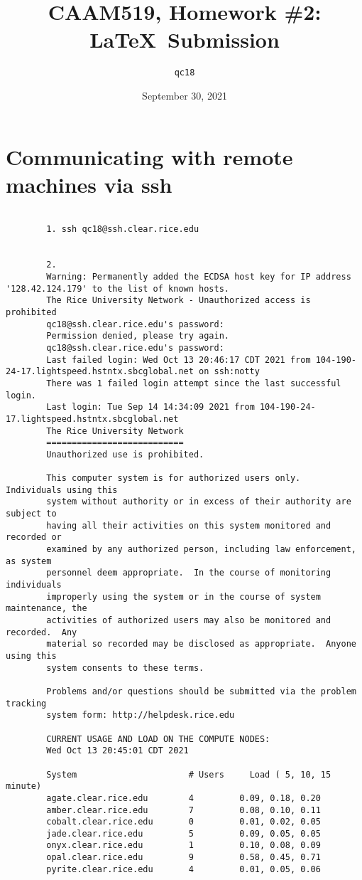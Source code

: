\documentclass[a4paper]{article}
\title{CAAM519, Homework \#2: \LaTeX\ Submission}
\author{\texttt{qc18}}
\date{September 30, 2021}
\begin{document}
	\maketitle
	
	\section{Communicating with remote machines via ssh}
	\begin{verbatim}
		
		1. ssh qc18@ssh.clear.rice.edu
		

		2.
		Warning: Permanently added the ECDSA host key for IP address '128.42.124.179' to the list of known hosts.
		The Rice University Network - Unauthorized access is prohibited
		qc18@ssh.clear.rice.edu's password: 
		Permission denied, please try again.
		qc18@ssh.clear.rice.edu's password: 
		Last failed login: Wed Oct 13 20:46:17 CDT 2021 from 104-190-24-17.lightspeed.hstntx.sbcglobal.net on ssh:notty
		There was 1 failed login attempt since the last successful login.
		Last login: Tue Sep 14 14:34:09 2021 from 104-190-24-17.lightspeed.hstntx.sbcglobal.net
		The Rice University Network
		===========================
		Unauthorized use is prohibited.
		
		This computer system is for authorized users only.  Individuals using this
		system without authority or in excess of their authority are subject to
		having all their activities on this system monitored and recorded or
		examined by any authorized person, including law enforcement, as system
		personnel deem appropriate.  In the course of monitoring individuals
		improperly using the system or in the course of system maintenance, the
		activities of authorized users may also be monitored and recorded.  Any
		material so recorded may be disclosed as appropriate.  Anyone using this
		system consents to these terms.
		
		Problems and/or questions should be submitted via the problem tracking
		system form: http://helpdesk.rice.edu
		
		CURRENT USAGE AND LOAD ON THE COMPUTE NODES:
		Wed Oct 13 20:45:01 CDT 2021
		
		System                   	# Users   	Load ( 5, 10, 15 minute)      
		agate.clear.rice.edu   	    4     	  0.09, 0.18, 0.20            
		amber.clear.rice.edu   	    7     	  0.08, 0.10, 0.11            
		cobalt.clear.rice.edu  	    0     	  0.01, 0.02, 0.05            
		jade.clear.rice.edu    	    5     	  0.09, 0.05, 0.05            
		onyx.clear.rice.edu    	    1     	  0.10, 0.08, 0.09            
		opal.clear.rice.edu    	    9     	  0.58, 0.45, 0.71            
		pyrite.clear.rice.edu  	    4     	  0.01, 0.05, 0.06            
		

\end{verbatim}
\end{document}
